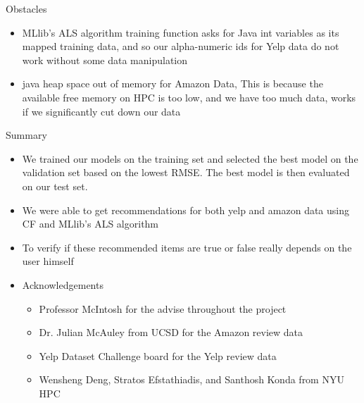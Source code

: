 \documentclass{beamer}
\begin{document}

\begin{frame}{Obstacles}

  \begin{itemize}
      \item { MLlib's ALS algorithm training function asks for Java int variables as its mapped training data, and so our alpha-numeric ids for Yelp data do not work without some data manipulation }
      \item { java heap space out of memory for Amazon Data, This is because the available free memory on HPC is too low, and we have too much data, works if we significantly cut down our data}
  \end{itemize}
  
\end{frame}



\begin{frame}{Summary}
  \begin{itemize}
    \item{
    We trained our models on the training set and selected the best model on the validation set based on the lowest RMSE.  The best model is then evaluated on our test set.
    }
  \item {
    We were able to get recommendations for both yelp and amazon data using CF and MLlib's ALS algorithm
    }
    \item{
    To verify if these recommended items are true or false really depends on the user himself
    }
  \end{itemize}
  
  \begin{itemize}
  \item
    Acknowledgements
    \begin{itemize}
    \item
      Professor McIntosh for the advise throughout the project
    \item
      Dr. Julian McAuley from UCSD for the Amazon review data
    \item
      Yelp Dataset Challenge board for the Yelp review data
    \item
      Wensheng Deng, Stratos Efstathiadis, and Santhosh Konda from NYU HPC
    \end{itemize}
  \end{itemize}
\end{frame}
\end{document}
